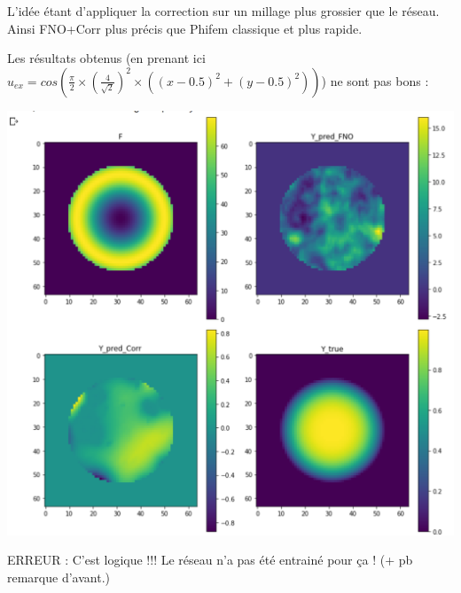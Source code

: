 \begin{Rem}
	L'idée étant d'appliquer la correction sur un millage plus grossier que le réseau. Ainsi FNO+Corr plus précis que Phifem classique et plus rapide.
\end{Rem}

Les résultats obtenus (en prenant ici $u_{ex}=cos\left(\frac{\pi}{2}\times\left(\frac{4}{\sqrt{2}}\right)^2\times\left((x-0.5)^2+(y-0.5)^2\right)\right)$) ne sont pas bons :

\begin{minipage}{\linewidth}
	\centering
	\includegraphics[width=0.45\linewidth]{resultats.png}
\end{minipage}

\begin{Rem}
	ERREUR : C'est logique !!! Le réseau n'a pas été entrainé pour ça ! (+ pb remarque d'avant.)
\end{Rem}



